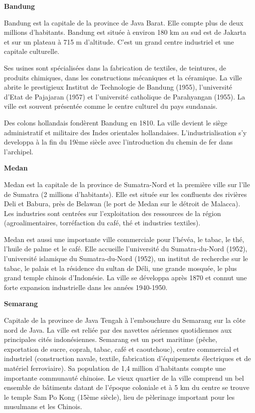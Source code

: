 \textbf{Bandung}

Bandung est la capitale de la province de Java Barat. Elle compte plus de deux millions d'habitants. Bandung est située à environ 180 km au sud est de Jakarta et sur un plateau à 715 m d'altitude. C'est un grand centre industriel et une capitale culturelle.

Ses usines sont spécialisées dans la fabrication de textiles, de teintures, de produits chimiques, dans les constructions mécaniques et la céramique. La ville abrite le prestigieux Institut de Technologie de Bandung (1955), l'université d'Etat de Pajajaran (1957) et l'université catholique de Parahyangan (1955). La ville est souvent présentée comme le centre culturel du pays sundanais.

Des colons hollandais fondèrent Bandung en 1810. La ville devient le siège administratif et militaire des Indes orientales hollandaises. L'industrialisation s'y developpa à la fin du 19ème siècle avec l'introduction du chemin de fer dans l'archipel.

\textbf{Medan}

Medan est la capitale de la province de Sumatra-Nord et la première ville sur l'île de Sumatra (2 millions d'habitants). Elle est située sur les confluents des rivières Deli et Babura, près de Belawan (le port de Medan sur le détroit de Malacca). Les industries sont centrées sur l'exploitation des ressources de la région (agroalimentaires, torréfaction du café, thé et industries textiles).

Medan est aussi une importante ville commerciale pour l'hévéa, le tabac, le thé, l'huile de palme et le café. Elle accueille l'université du Sumatra-du-Nord (1952), l'université islamique du Sumatra-du-Nord (1952), un institut de recherche sur le tabac, le palais et la résidence du sultan de Déli, une grande mosquée, le plus grand temple chinois d'Indonésie. La ville se développa après 1870 et connut une forte expansion industrielle dans les années 1940-1950.

\textbf{Semarang}

Capitale de la province de Java Tengah à l'embouchure du Semarang sur la côte nord de Java. La ville est reliée par des navettes aériennes quotidiennes aux principales cités indonésiennes. Semarang est un port maritime (pêche, exportation de sucre, coprah, tabac, café et caoutchouc), centre commercial et industriel (construction navale, textile, fabrication d'équipements électriques et de matériel ferroviaire). Sa population de 1,4 million d'habitants compte une importante communauté chinoise. Le vieux quartier de la ville comprend un bel ensemble de bâtiments datant de l'époque coloniale et à 5 km du centre se trouve le temple Sam Po Kong (15ème siècle), lieu de pèlerinage important pour les musulmans et les Chinois.

